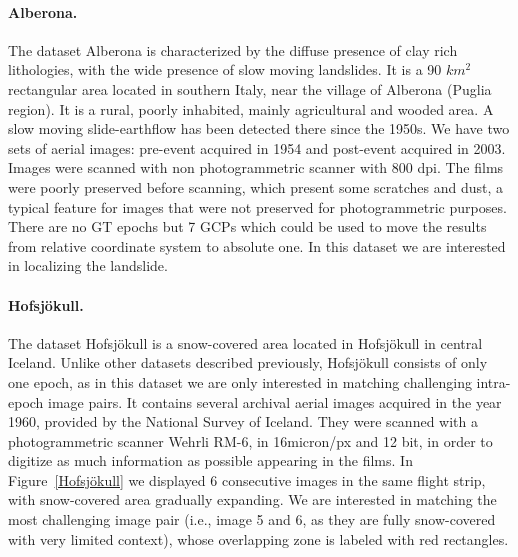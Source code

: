 \paragraph{Alberona.}
The dataset Alberona is characterized by the diffuse presence of clay rich lithologies, with the wide presence of slow moving landslides. It is a 90 $km^2$ rectangular area located in southern Italy, near the village of Alberona (Puglia region). 
It is a rural, poorly inhabited, mainly agricultural and wooded area. A slow moving slide-earthflow has been detected there since the 1950s. We have two sets of aerial images: pre-event acquired in 1954 and post-event acquired in 2003. 
Images were scanned with non photogrammetric scanner with 800 dpi. The films were poorly preserved before scanning, which present some scratches and dust, a typical feature for images that were not preserved for photogrammetric purposes.
There are no \ac{GT} epochs but 7 \ac{GCP}s which could be used to move the results from relative coordinate system to absolute one.
In this dataset we are interested in localizing the landslide.

\paragraph{Hofsjökull.}
The dataset Hofsjökull is a snow-covered area located in Hofsjökull in central Iceland. Unlike other datasets described previously, Hofsjökull consists of only one epoch, as in this dataset we are only interested in matching challenging intra-epoch image pairs. It contains several archival aerial images acquired in the year 1960, provided by the National Survey of Iceland. They were scanned with a photogrammetric scanner Wehrli RM-6, in 16micron/px and 12 bit, in order to digitize as much information as possible appearing in the films. In Figure~\ref{Hofsjökull} we displayed 6 consecutive images in the same flight strip, with snow-covered area gradually expanding. We are interested in matching the most challenging image pair (i.e., image 5 and 6, as they are fully snow-covered with very limited context), whose overlapping zone is labeled with red rectangles. 


